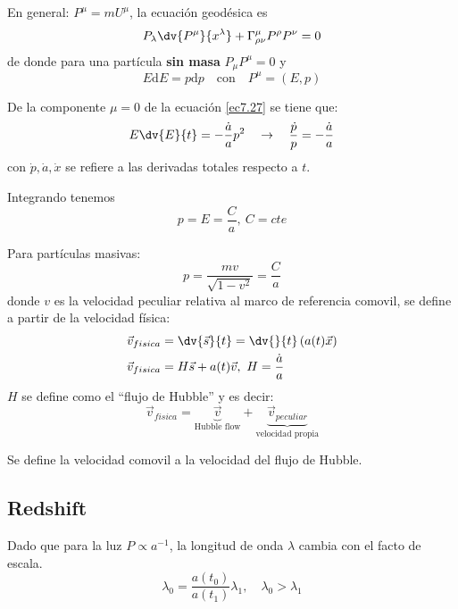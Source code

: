 \documentclass[../main]{subfiles}
\begin{document}
\begin{adjustwidth}{0pt}{-100pt}
En general: $P^{\mu}=mU^{\mu}$, la ecuación geodésica es 
\begin{equation}
    P_{\lambda}\dv{P^{\mu}}{x^{\lambda}}+\Gamma^{\mu}_{\rho\nu}P^{\rho}P^{\nu}=0
    \label{ec7.27}
\end{equation}
de donde para una partícula \textbf{sin masa} $P_{\mu}P^{\mu}=0$ y
\begin{equation}
    E\mathrm{d}E=p\mathrm{d}p\quad \text{con} \quad P^{\mu}=(E, p)
\end{equation}

De la componente $\mu=0$ de la ecuación \eqref{ec7.27} se tiene que:
\begin{equation}
    E\dv{E}{t}=-\dfrac{\dot{a}}{a}p^2 \quad \rightarrow \quad \dfrac{\dot{p}}{p}=-\dfrac{\dot{a}}{a}
\end{equation}
con $\dot{p}, \dot{a}, \dot{x}$ se refiere a las derivadas totales respecto a $t$.

Integrando tenemos
\begin{equation}
    p=E=\dfrac{C}{a}, \ C=cte
\end{equation}

Para partículas masivas:
\begin{equation}
    p=\dfrac{mv}{\sqrt{1-v^2}}=\dfrac{C}{a}
\end{equation}
donde $v$ es la velocidad peculiar relativa al marco de referencia comovil, se define a partir de la velocidad física:
\begin{equation}
    \begin{split}
        \vec{v}_{fisica}&=\dv{\vec{s}}{t}=\dv{}{t}\left(a(t)\vec{x}\right)\\
        \vec{v}_{fisica}&=H\vec{s}+a(t)\vec{v},\ H=\dfrac{\dot{a}}{a}
    \end{split}
\end{equation}
$H$ se define como el ``flujo de Hubble'' y es decir:
\begin{equation}
    \vec{v}_{fisica}=\underbrace{\vec{v}}_{\text{Hubble flow}}+\underbrace{\vec{v}_{peculiar}}_{\text{velocidad propia}}
\end{equation}

Se define la velocidad comovil a la velocidad del flujo de Hubble.

\subsection{Redshift}

Dado que para la luz $P \propto a^{-1}$, la longitud de onda $\lambda$ cambia con el facto de escala.
\begin{equation}
    \lambda_0=\dfrac{a(t_0)}{a(t_1)}\lambda_1,\quad \lambda_0>\lambda_1
\end{equation}


\end{adjustwidth}
\end{document}

